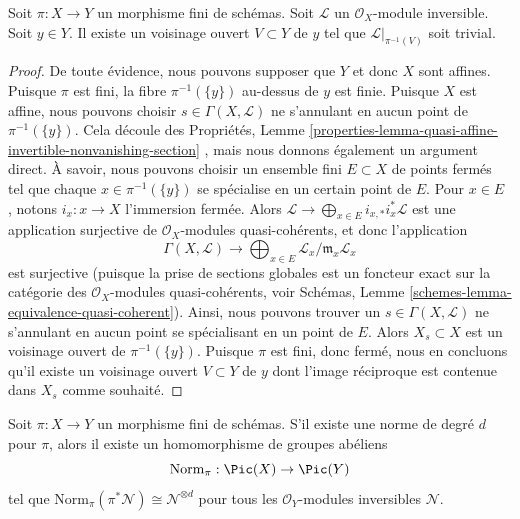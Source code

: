 \begin{lemma}
\label{lemma-finite-trivialize-invertible-upstairs}
Soit  $\pi : X \to Y$  un morphisme fini de schémas. Soit  $\mathcal{L}$  un
 $\mathcal{O}_X$-module inversible. Soit  $y \in Y$. Il existe un voisinage ouvert
 $V \subset Y$  de  $y$  tel que  $\mathcal{L}|_{\pi^{-1}(V)}$  soit trivial.
\end{lemma}

\begin{proof}
De toute évidence, nous pouvons supposer que  $Y$  et donc  $X$ 
sont affines. Puisque  $\pi$  est fini, la fibre  $\pi^{-1}(\{y\})$  au-dessus de
 $y$  est finie. Puisque  $X$  est affine, nous pouvons choisir
 $s \in \Gamma(X, \mathcal{L})$  ne s'annulant en aucun point de  $\pi^{-1}(\{y\})$. Cela découle des
Propriétés, Lemme  \ref{properties-lemma-quasi-affine-invertible-nonvanishing-section} , mais nous donnons également un argument direct. À
savoir, nous pouvons choisir un ensemble fini  $E \subset X$  de points fermés tel
que chaque  $x \in \pi^{-1}(\{y\})$  se spécialise en un certain point de  $E$. Pour
 $x \in E$ , notons  $i_x : x \to X$  l'immersion fermée. Alors  $\mathcal{L} \to \bigoplus_{x \in E} i_{x, *}i_x^*\mathcal{L}$  est une
application surjective de  $\mathcal{O}_X$-modules quasi-cohérents, et donc
l'application
$$
\Gamma(X, \mathcal{L}) \to
\bigoplus\nolimits_{x \in E} \mathcal{L}_x/\mathfrak m_x\mathcal{L}_x
$$
est surjective (puisque la prise de sections globales est un foncteur exact sur la
catégorie des  $\mathcal{O}_X$-modules quasi-cohérents, voir Schémas, Lemme
 \ref{schemes-lemma-equivalence-quasi-coherent}). Ainsi, nous pouvons trouver un  $s \in \Gamma(X, \mathcal{L})$  ne s'annulant en aucun
point se spécialisant en un point de  $E$. Alors  $X_s \subset X$  est un
voisinage ouvert de  $\pi^{-1}(\{y\})$. Puisque  $\pi$  est fini, donc fermé, nous
en concluons qu'il existe un voisinage ouvert  $V \subset Y$  de  $y$  dont
l'image réciproque est contenue dans  $X_s$  comme souhaité.
\end{proof}

\begin{lemma}
\label{lemma-norm-invertible}
Soit  $\pi : X \to Y$  un morphisme fini de schémas. S'il existe une norme de degré
 $d$  pour  $\pi$, alors il existe un homomorphisme de groupes
abéliens
$$
\text{Norm}_\pi : \Pic(X) \to \Pic(Y)
$$
tel que  $\text{Norm}_\pi(\pi^*\mathcal{N}) \cong \mathcal{N}^{\otimes d}$  pour tous les  $\mathcal{O}_Y$-modules inversibles  $\mathcal{N}$.
\end{lemma}

